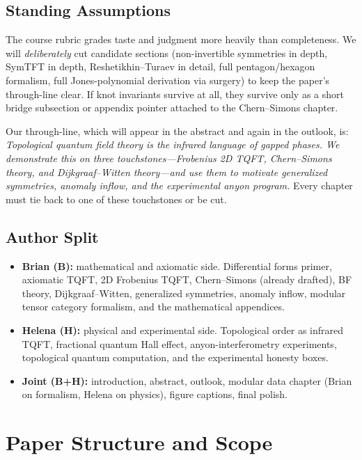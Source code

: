 \documentclass[11pt]{article}
\begin{document}
\subsection{Standing Assumptions}

\begin{insight}
The course rubric grades taste and judgment more heavily than completeness. We will
\emph{deliberately} cut candidate sections (non-invertible symmetries in depth, SymTFT in
depth, Reshetikhin--Turaev in detail, full pentagon/hexagon formalism, full Jones-polynomial
derivation via surgery) to keep the paper's through-line clear. If knot invariants survive
at all, they survive only as a short bridge subsection or appendix pointer attached to the
Chern--Simons chapter.
\end{insight}

Our through-line, which will appear in the abstract and again in the outlook, is:
\emph{Topological quantum field theory is the infrared language of gapped phases. We
demonstrate this on three touchstones---Frobenius 2D TQFT, Chern--Simons theory, and
Dijkgraaf--Witten theory---and use them to motivate generalized symmetries, anomaly inflow,
and the experimental anyon program.} Every chapter must tie back to one of these
touchstones or be cut.

\subsection{Author Split}\label{sec:split}

\begin{itemize}
\item \textbf{Brian (B):} mathematical and axiomatic side. Differential forms primer,
axiomatic TQFT, 2D Frobenius TQFT, Chern--Simons (already drafted), BF theory,
Dijkgraaf--Witten, generalized symmetries, anomaly inflow, modular tensor category
formalism, and the mathematical appendices.
\item \textbf{Helena (H):} physical and experimental side. Topological order as
infrared TQFT, fractional quantum Hall effect, anyon-interferometry experiments,
topological quantum computation, and the experimental honesty boxes.
\item \textbf{Joint (B+H):} introduction, abstract, outlook, modular data chapter
(Brian on formalism, Helena on physics), figure captions, final polish.
\end{itemize}

\section{Paper Structure and Scope}\label{sec:structure}
\end{document}
